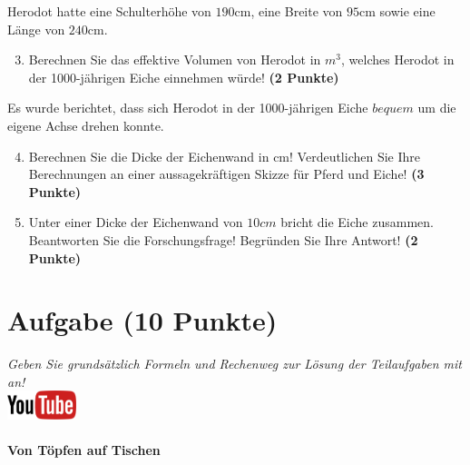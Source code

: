 \documentclass[a4paper, 10pt]{scrartcl}\usepackage[]{graphicx}\usepackage[]{xcolor}
\begin{document}
Herodot hatte eine Schulterh{\"o}he von $190$cm, eine Breite von
$95$cm sowie eine L{\"a}nge von  $240$cm.

\begin{enumerate}
  \setcounter{enumi}{2}
\item Berechnen Sie das effektive Volumen von Herodot in $m^3$, welches
  Herodot in der 1000-j{\"a}hrigen Eiche einnehmen w{\"u}rde! \textbf{(2 Punkte)}
\end{enumerate}

Es wurde berichtet, dass sich Herodot in der 1000-j{\"a}hrigen Eiche
$bequem$ um die eigene Achse drehen konnte.

\begin{enumerate}
  \setcounter{enumi}{3}
\item Berechnen Sie die Dicke der Eichenwand in cm! Verdeutlichen Sie Ihre
  Berechnungen an einer aussagekr{\"a}ftigen Skizze f{\"u}r Pferd und Eiche! \textbf{(3 Punkte)} 
\item Unter einer Dicke der Eichenwand von $10cm$ bricht
  die Eiche zusammen. Beantworten Sie die Forschungsfrage! Begr{\"u}nden Sie
  Ihre Antwort! \textbf{(2 Punkte)} 
\end{enumerate}
 
\clearpage

\section{Aufgabe \hfill (10 Punkte)}

\textit{Geben Sie grunds{\"a}tzlich Formeln und Rechenweg zur L{\"o}sung der
  Teilaufgaben mit an!} \\[1Ex]

\hfill\href{https://youtu.be/57B-yYoFSk0}{\includegraphics[width =
  2cm]{img/youtube}} %
\hspace{2Ex}

\paragraph{Von T{\"o}pfen auf Tischen}
\end{document}
